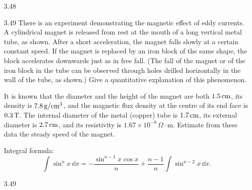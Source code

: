 \begin{figbox}{3.48}
\end{figbox}

\begin{problem}{3.49}
There is an experiment demonstrating the magnetic effect of eddy currents. A cylindrical magnet is released from rest at the mouth of a long vertical metal tube, as shown. After a short acceleration, the magnet falls slowly at a certain constant speed. If the magnet is replaced by an iron block of the same shape, the block accelerates downwards just as in free fall. (The fall of the magnet or of the iron block in the tube can be observed through holes drilled horizontally in the wall of the tube, as shown.) Give a quantitative explanation of this phenomenon.

It is known that the diameter and the height of the magnet are both $1.5\,\mathrm{cm}$, its density is $7.8\,\mathrm{g/cm^3}$, and the magnetic flux density at the centre of its end face is $0.3\,\mathrm{T}$. The internal diameter of the metal (copper) tube is $1.7\,\mathrm{cm}$, its external diameter is $2.7\,\mathrm{cm}$, and its resistivity is $1.67\times10^{-8}\,\Omega\cdot\mathrm{m}$. Estimate from these data the steady speed of the magnet.

Integral formula:
\begin{equation*}
\int\sin^n x\,\dd x=-\dfrac{\sin^{n-1}x\cos x}{n}+\dfrac{n-1}{n}\int\sin^{n-2}x\,\dd x.
\end{equation*}
\end{problem}

\begin{figbox}{3.49}
\end{figbox}

